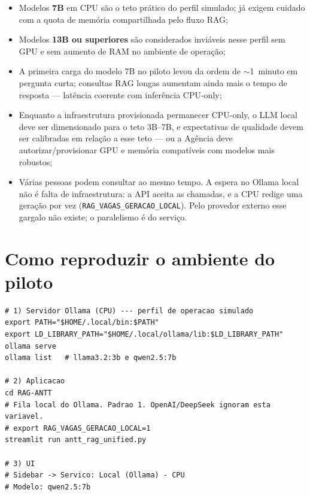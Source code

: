 \documentclass[12pt, a4paper]{article}
\begin{document}
\begin{itemize}
  \item Modelos \textbf{7B} em CPU são o teto prático do perfil simulado; já exigem cuidado com a quota de memória compartilhada pelo fluxo RAG;
  \item Modelos \textbf{13B ou superiores} são considerados inviáveis nesse perfil sem GPU e sem aumento de RAM no ambiente de operação;
  \item A primeira carga do modelo 7B no piloto levou da ordem de $\sim$1~minuto em pergunta curta; consultas RAG longas aumentam ainda mais o tempo de resposta --- latência coerente com inferência CPU-only;
  \item Enquanto a infraestrutura provisionada permanecer CPU-only, o LLM local deve ser dimensionado para o teto 3B--7B, e expectativas de qualidade devem ser calibradas em relação a esse teto --- ou a Agência deve autorizar/provisionar GPU e memória compatíveis com modelos mais robustos;
  \item Várias pessoas podem consultar ao mesmo tempo. A espera no Ollama local não é falta de infraestrutura: a API aceita as chamadas, e a CPU redige uma geração por vez (\texttt{RAG\_VAGAS\_GERACAO\_LOCAL}). Pelo provedor externo esse gargalo não existe; o paralelismo é do serviço.
\end{itemize}

\section{Como reproduzir o ambiente do piloto}

\begin{lstlisting}
# 1) Servidor Ollama (CPU) --- perfil de operacao simulado
export PATH="$HOME/.local/bin:$PATH"
export LD_LIBRARY_PATH="$HOME/.local/ollama/lib:$LD_LIBRARY_PATH"
ollama serve
ollama list   # llama3.2:3b e qwen2.5:7b

# 2) Aplicacao
cd RAG-ANTT
# Fila local do Ollama. Padrao 1. OpenAI/DeepSeek ignoram esta variavel.
# export RAG_VAGAS_GERACAO_LOCAL=1
streamlit run antt_rag_unified.py

# 3) UI
# Sidebar -> Servico: Local (Ollama) - CPU
# Modelo: qwen2.5:7b
\end{lstlisting}

\end{document}
